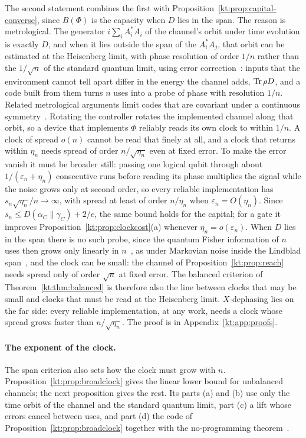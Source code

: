 The second statement combines the first with Proposition~\ref{kt:prop:capital-converse}, since $B(\Phi)$ is the capacity when $D$ lies in the span. The reason is metrological. The generator $i\sum_iA_i^*\dot A_i$ of the channel's orbit under time evolution is exactly $D$, and when it lies outside the span of the $A_i^*A_j$, that orbit can be estimated at the Heisenberg limit, with phase resolution of order $1/n$ rather than the $1/\sqrt n$ of the standard quantum limit, using error correction~\cite{ZhouZhangPreskillJiang18,ZhouJiang21}: inputs that the environment cannot tell apart differ in the energy the channel adds, $\operatorname{Tr}\rho D$, and a code built from them turns $n$ uses into a probe of phase with resolution $1/n$. Related metrological arguments limit codes that are covariant under a continuous symmetry~\cite{KubicaDemkowicz21,ZhouLiuJiang21}. Rotating the controller rotates the implemented channel along that orbit, so a device that implements $\Phi$ reliably reads its own clock to within $1/n$. A clock of spread $o(n)$ cannot be read that finely at all, and a clock that returns within $\eta_n$ needs spread of order $n/\sqrt{\eta_n}$ even at fixed error. To make the error vanish it must be broader still: passing one logical qubit through about $1/(\varepsilon_n+\eta_n)$ consecutive runs before reading its phase multiplies the signal while the noise grows only at second order, so every reliable implementation has $s_n\sqrt{\eta_n}/n\to\infty$, with spread at least of order $n/\eta_n$ when $\varepsilon_n=O(\eta_n)$. Since $s_n\le D(\alpha_C\|\gamma_C)+2/e$, the same bound holds for the capital; for a gate it improves Proposition~\ref{kt:prop:clockcost}(a) whenever $\eta_n=o(\varepsilon_n)$. When $D$ lies in the span there is no such probe, since the quantum Fisher information of $n$ uses then grows only linearly in $n$~\cite{FujiwaraImai08,DKG12,DemkowiczMaccone14,SSKD17,ZhouJiang21}, as under Markovian noise inside the Lindblad span~\cite{DemkowiczCzajkowskiSekatski17}, and the clock can be small: the channel of Proposition~\ref{kt:prop:reach} needs spread only of order $\sqrt n$ at fixed error. The balanced criterion of Theorem~\ref{kt:thm:balanced} is therefore also the line between clocks that may be small and clocks that must be read at the Heisenberg limit. $X$-dephasing lies on the far side: every reliable implementation, at any work, needs a clock whose spread grows faster than $n/\sqrt{\eta_n}$. The proof is in Appendix~\ref{kt:app:proofs}.

\paragraph{The exponent of the clock.} The span criterion also sets how the clock must grow with $n$. Proposition~\ref{kt:prop:broadclock} gives the linear lower bound for unbalanced channels; the next proposition gives the rest. Its parts (a) and (b) use only the time orbit of the channel and the standard quantum limit, part (c) a lift whose errors cancel between uses, and part (d) the code of Proposition~\ref{kt:prop:broadclock} together with the no-programming theorem~\cite{NielsenChuang97,KubickiPalazuelosPerezGarcia19}.

